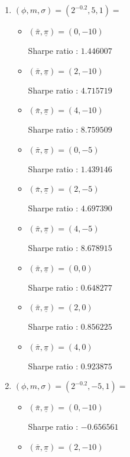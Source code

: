 \documentclass[12pt]{article}
\begin{document}
\begin{enumerate}
\begin{enumerate}
\begin{itemize}
\end{itemize}

\item$(\phi, m, \sigma) = (2^{-0.2},5,1) = $

\begin{itemize}

\item $(\bar{\pi}, \underline{\pi}) = (0,-10)$

Sharpe ratio : $1.446007$

\item $(\bar{\pi}, \underline{\pi}) = (2,-10)$

Sharpe ratio : $4.715719$

\item $(\bar{\pi}, \underline{\pi}) = (4,-10)$

Sharpe ratio : $8.759509$

\item $(\bar{\pi}, \underline{\pi}) = (0,-5)$

Sharpe ratio : $1.439146$

\item $(\bar{\pi}, \underline{\pi}) = (2,-5)$

Sharpe ratio : $4.697390$

\item $(\bar{\pi}, \underline{\pi}) = (4,-5)$

Sharpe ratio : $8.678915$

\item $(\bar{\pi}, \underline{\pi}) = (0,0)$

Sharpe ratio : $0.648277$

\item $(\bar{\pi}, \underline{\pi}) = (2,0)$

Sharpe ratio : $0.856225$

\item $(\bar{\pi}, \underline{\pi}) = (4,0)$

Sharpe ratio : $0.923875$

\end{itemize}
\newpage
\item$(\phi, m, \sigma) = (2^{-0.2},-5,1) = $

\begin{itemize}

\item $(\bar{\pi}, \underline{\pi}) = (0,-10)$

Sharpe ratio : $-0.656561$

\item $(\bar{\pi}, \underline{\pi}) = (2,-10)$


\end{itemize}
\end{enumerate}
\end{enumerate}
\end{document}
